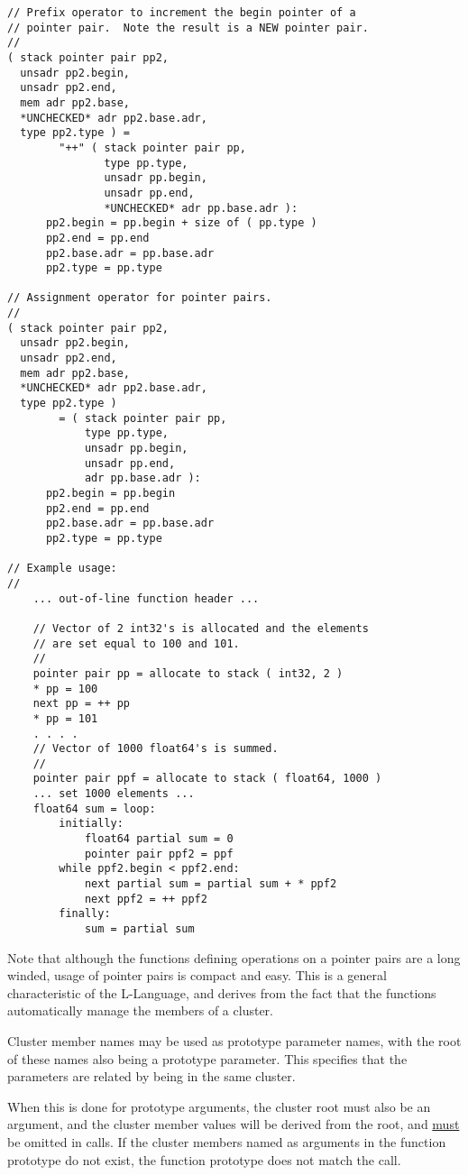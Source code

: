 \documentclass[12pt]{article}
\newenvironment{indpar}[1][0.3in]%
	{\begin{list}{}%
		     {\setlength{\itemsep}{0in}%
		      \setlength{\topsep}{0in}%
		      \setlength{\parsep}{1ex}%
		      \setlength{\labelwidth}{#1}%
		      \setlength{\leftmargin}{#1}%
		      \addtolength{\leftmargin}{\labelsep}}%
	 \item}%
	{\end{list}}
\begin{document}
\begin{indpar}
\begin{verbatim}
// Prefix operator to increment the begin pointer of a
// pointer pair.  Note the result is a NEW pointer pair.
//
( stack pointer pair pp2,
  unsadr pp2.begin,
  unsadr pp2.end,
  mem adr pp2.base,
  *UNCHECKED* adr pp2.base.adr,
  type pp2.type ) =
        "++" ( stack pointer pair pp,
               type pp.type,
               unsadr pp.begin,
               unsadr pp.end,
               *UNCHECKED* adr pp.base.adr ):
      pp2.begin = pp.begin + size of ( pp.type )
      pp2.end = pp.end
      pp2.base.adr = pp.base.adr
      pp2.type = pp.type

// Assignment operator for pointer pairs.
//
( stack pointer pair pp2,
  unsadr pp2.begin,
  unsadr pp2.end,
  mem adr pp2.base,
  *UNCHECKED* adr pp2.base.adr,
  type pp2.type )
        = ( stack pointer pair pp,
            type pp.type,
            unsadr pp.begin,
            unsadr pp.end,
            adr pp.base.adr ):
      pp2.begin = pp.begin
      pp2.end = pp.end
      pp2.base.adr = pp.base.adr
      pp2.type = pp.type

// Example usage:
//
    ... out-of-line function header ...

    // Vector of 2 int32's is allocated and the elements
    // are set equal to 100 and 101.
    //
    pointer pair pp = allocate to stack ( int32, 2 )
    * pp = 100
    next pp = ++ pp
    * pp = 101
    . . . .
    // Vector of 1000 float64's is summed.
    //
    pointer pair ppf = allocate to stack ( float64, 1000 )
    ... set 1000 elements ...
    float64 sum = loop:
        initially:
            float64 partial sum = 0
            pointer pair ppf2 = ppf
        while ppf2.begin < ppf2.end:
            next partial sum = partial sum + * ppf2
            next ppf2 = ++ ppf2
        finally:
            sum = partial sum
\end{verbatim}\end{indpar}

Note that although the functions defining operations on a pointer pairs
are a long winded, usage of pointer pairs is compact and easy.
This is a general characteristic of the L-Language, and derives
from the fact that the functions automatically manage the members
of a cluster.

Cluster member names may be used as prototype parameter
names, with the root of these names also being a prototype
parameter.  This specifies that the parameters are related
by being in the same cluster.

When this is done for prototype arguments, the cluster root must
also be an argument, and the cluster member values
will be derived from the root, and \underline{must}
be omitted in calls.  If the cluster members named as arguments
in the function prototype do not exist,
the function prototype does not match the call.
\end{document}
